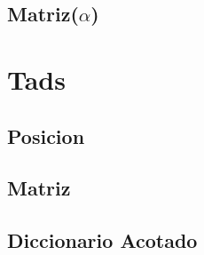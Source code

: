 \documentclass[a4paper,10pt, nofootinbib]{article}
\begin{document}
\subsection{Matriz($\alpha$)}


\clearpage
\section{Tads}
\subsection{Posicion}

\clearpage
\subsection{Matriz}

\clearpage
\subsection{Diccionario Acotado}

\end{document}
